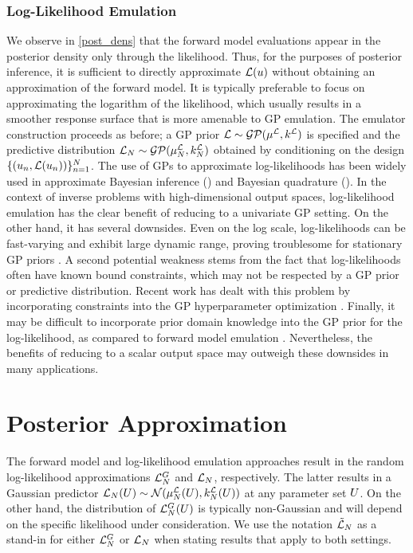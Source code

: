 \documentclass[12pt]{article}
\begin{document}
\subsubsection{Log-Likelihood Emulation}
We observe in \ref{post_dens} that the forward model evaluations appear in the posterior density only through the 
likelihood. Thus, for the purposes of posterior inference, it is sufficient to directly approximate $\llik(\Par)$ without 
obtaining an approximation of the forward model. It is typically preferable to focus on approximating the logarithm 
of the likelihood, which usually results in a smoother response surface that is more amenable to GP emulation. 
The emulator construction proceeds as before; a GP prior $\llik \sim \GP(\emMeanPrior{\llik}, \emKerPrior{\llik})$ 
is specified and the predictive 
distribution $\llikEm[\Ndesign] \sim \GP(\emMean[\Ndesign]{\llik}, \emKer[\Ndesign]{\llik})$ obtained by 
conditioning on the design $\{(\Par_{\idxDesign}, \llik(\Par_{\idxDesign}))\}_{\idxDesign=1}^{\Ndesign}$. 
The use of GPs to approximate log-likelihoods has been widely used in approximate Bayesian inference 
(\cite{VehtariParallelGP, Kandasamy_2017, llikRBF, trainDynamics, quantileApprox, wang2018adaptive, landslideCalibration})
and Bayesian quadrature (\cite{BayesQuadrature, BayesQuadRatios}). In the context of inverse problems with 
high-dimensional output spaces, log-likelihood emulation has the clear benefit of reducing to a univariate GP setting. 
On the other hand, it has several downsides. Even on the log scale, log-likelihoods can be fast-varying and exhibit large 
dynamic range, proving troublesome for stationary GP priors \cite{wang2018adaptive}. A second potential weakness 
stems from the fact that log-likelihoods often have known bound constraints, which may not be respected by a GP 
prior or predictive distribution. Recent work has dealt with this problem by incorporating constraints into the 
GP hyperparameter optimization \cite{quantileApprox}. Finally, it may be difficult to incorporate prior domain knowledge 
into the GP prior for the log-likelihood, as compared to forward model emulation \cite{GP_PDE_priors}. 
Nevertheless, the benefits of reducing to a scalar output space may outweigh these downsides in many applications. 

\section{Posterior Approximation}
The forward model and log-likelihood emulation approaches result in the random log-likelihood approximations 
$\llikEmFwd[\Ndesign]$ and $\llikEm[\Ndesign]$, respectively. The latter results in a Gaussian predictor 
$\llikEm[\Ndesign](\parMat) \sim \Gaussian(\emMean[\Ndesign]{\llik}(\parMat), \emKer[\Ndesign]{\llik}(\parMat))$ 
at any parameter set $\parMat$. On the other hand, the distribution of $\llikEmFwd[\Ndesign](\parMat)$ is 
typically non-Gaussian and will depend on the specific likelihood under consideration. We use the notation  
$\llikEmGeneric[\Ndesign]$ as a stand-in for either $\llikEmFwd[\Ndesign]$ or $\llikEm[\Ndesign]$ when 
stating results that apply to both settings. 
\end{document}
